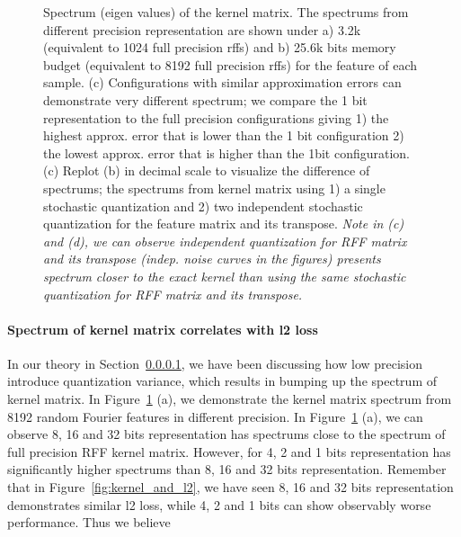\begin{figure}
	\caption{Spectrum (eigen values) of the kernel matrix. The spectrums from different precision representation are shown under a) 3.2k (equivalent to 1024 full precision rffs) and b) 25.6k bits memory budget (equivalent to 8192 full precision rffs) for the feature of each sample. (c) Configurations with similar approximation errors can demonstrate very different spectrum; we compare the 1 bit representation to the full precision configurations giving 1) the highest approx. error that is lower than the 1 bit configuration 2) the lowest approx. error that is higher than the 1bit configuration. (c) Replot (b) in decimal scale to visualize the difference of spectrums; the spectrums from kernel matrix using 1) a single stochastic quantization and 2) two independent stochastic quantization for the feature matrix and its transpose. \emph{Note in (c) and (d), we can observe independent quantization for RFF matrix and its transpose (indep. noise curves in the figures) presents spectrum closer to the exact kernel than using the same stochastic quantization for RFF matrix and its transpose.} }
	\label{fig:spectrums}
\end{figure}

\paragraph{Spectrum of kernel matrix correlates with l2 loss}
In our theory in Section~\ref{}, we have been discussing how low precision introduce quantization variance, which results in bumping up the spectrum of kernel matrix. In Figure~\ref{fig:spectrums} (a), we demonstrate the kernel matrix spectrum from 8192 random Fourier features in different precision. 
In Figure~\ref{fig:spectrums} (a), we can observe 8, 16 and 32 bits representation has spectrums close to the spectrum of full precision RFF kernel matrix. However, for 4, 2 and 1 bits representation has significantly higher spectrums than 8, 16 and 32 bits representation. Remember that in Figure~\ref{fig:kernel_and_l2}, we have seen 8, 16 and 32 bits representation demonstrates similar l2 loss, while 4, 2 and 1 bits can show observably worse performance. Thus we believe 

